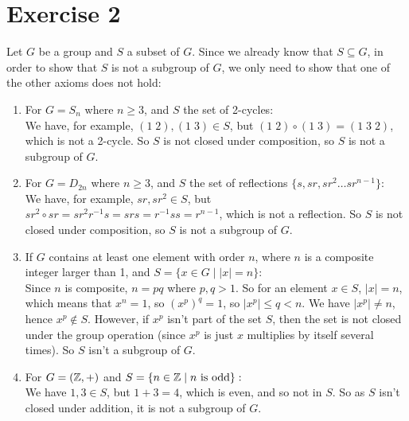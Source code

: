 \documentclass[12pt]{article}
\begin{document}
    \section*{Exercise 2}
    Let $G$ be a group and $S$ a subset of $G$.
    Since we already know that $S \subseteq G$,
    in order to show that $S$ is not a subgroup of $G$,
    we only need to show that one of the other axioms does not hold: \\
    \begin{enumerate}[label=\textbf{\alph*.}]
        \item 
            For $G = S_n$ where $n \geqslant 3$,
            and $S$ the set of 2-cycles: \\
            We have, for example, $(1\;2), (1\;3) \in S$,
            but $(1\;2) \circ (1\;3) = (1\;3\;2)$, which is not a 2-cycle.
            So $S$ is not closed under composition,
            so $S$ is not a subgroup of $G$.
        \item 
            For $G = D_{2n}$ where $n \geqslant 3$,
            and $S$ the set of reflections $\{s, sr, sr^2 \dots sr^{n-1}\}$: \\
            We have, for example, $sr, sr^2 \in S$,
            but $sr^2 \circ sr = sr^2r^{-1}s = srs = r^{-1}ss = r^{n-1}$,
            which is not a reflection.
            So $S$ is not closed under composition,
            so $S$ is not a subgroup of $G$.
        \item 
            If $G$ contains at least one element with order $n$,
            where $n$ is a composite integer larger than 1,
            and $S = \{x \in G \mid |x| = n\}$: \\
            Since $n$ is composite, $n = pq$ where $p,q > 1$.
            So for an element $x \in S$, $|x| = n$,
            which means that $x^n = 1$,
            so $(x^p)^q = 1$, so $|x^p| \leqslant q < n$.
            We have $|x^p| \neq n$,
            hence $x^p \notin S$.
            However, if $x^p$ isn't part of the set $S$,
            then the set is not closed under the group operation
            (since $x^p$ is just $x$ multiplies by itself several times).
            So $S$ isn't a subgroup of $G$.
        \item 
            For $G = (\mathbb{Z}, +)$
            and $S = \{n \in \mathbb{Z} \mid n \text{ is odd} \}:$ \\
            We have $1, 3 \in S$, but $1 + 3 = 4$, which is even,
            and so not in $S$.
            So as $S$ isn't closed under addition,
            it is not a subgroup of $G$.

\end{enumerate}
\end{document}
